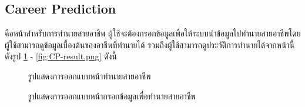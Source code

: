 \subsection{Career Prediction}
คือหน้าสำหรับการทำนายสายอาชีพ ผู้ใช้จะต้องกรอกข้อมูลเพื่อให้ระบบนำข้อมูลไปทํานายสายอาชีพโดยผู้ใช้สามารถดูข้อมูลเบื้องต้นของอาชีพที่ทำนายได้ รวมถึงผู้ใช้สามารถดูประวัติการทำนายได้จากหน้านี้ ดังรูป \ref{fig:CP.png} - \ref{fig:CP-result.png} ดังนี้
\begin{figure}[H]\centering
    \caption{รูปแสดงการออกแบบหน้าทำนายสายอาชีพ}\label{fig:CP.png}
\end{figure}
\begin{figure}[H]\centering
    \caption{รูปแสดงการออกแบบหน้ากรอกข้อมูลเพื่อทำนายสายอาชีพ}\label{fig:CP-input.png}
\end{figure}
